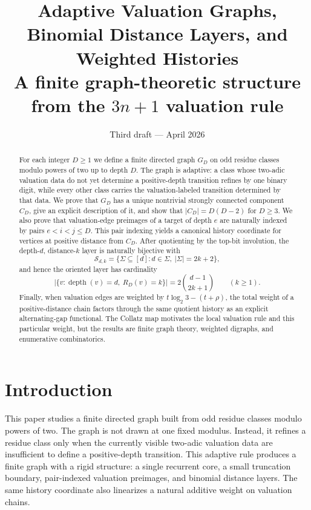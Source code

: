 \documentclass[11pt]{article}
\title{Adaptive Valuation Graphs, Binomial Distance Layers, and Weighted Histories\\
\large A finite graph-theoretic structure from the \texorpdfstring{$3n+1$}{3n+1} valuation rule}
\author{}
\date{Third draft --- April 2026}
\theoremstyle{definition}
\theoremstyle{remark}
\newcommand{\depth}{\operatorname{depth}}
\newcommand{\Sfam}{\mathcal S}
\begin{document}
\maketitle

\begin{abstract}
For each integer $D\ge 1$ we define a finite directed graph $G_D$ on odd residue classes modulo powers of two up to depth $D$.  The graph is adaptive: a class whose two-adic valuation data do not yet determine a positive-depth transition refines by one binary digit, while every other class carries the valuation-labeled transition determined by that data.  We prove that $G_D$ has a unique nontrivial strongly connected component $C_D$, give an explicit description of it, and show that $|C_D|=D(D-2)$ for $D\ge3$.  We also prove that valuation-edge preimages of a target of depth $e$ are naturally indexed by pairs $e<i<j\le D$.  This pair indexing yields a canonical history coordinate for vertices at positive distance from $C_D$.  After quotienting by the top-bit involution, the depth-$d$, distance-$k$ layer is naturally bijective with
\[
\Sfam_{d,k}=\{\Sigma\subseteq[d]: d\in\Sigma,\ |\Sigma|=2k+2\},
\]
and hence the oriented layer has cardinality
\[
\bigl|\{v:\depth(v)=d,\ R_D(v)=k\}\bigr|=2\binom{d-1}{2k+1}\qquad(k\ge1).
\]
Finally, when valuation edges are weighted by $t\log_2 3-(t+\rho)$, the total weight of a positive-distance chain factors through the same quotient history as an explicit alternating-gap functional.  The Collatz map motivates the local valuation rule and this particular weight, but the results are finite graph theory, weighted digraphs, and enumerative combinatorics.
\end{abstract}

\section{Introduction}

This paper studies a finite directed graph built from odd residue classes modulo powers of two.  The graph is not drawn at one fixed modulus.  Instead, it refines a residue class only when the currently visible two-adic valuation data are insufficient to define a positive-depth transition.  This adaptive rule produces a finite graph with a rigid structure: a single recurrent core, a small truncation boundary, pair-indexed valuation preimages, and binomial distance layers.  The same history coordinate also linearizes a natural additive weight on valuation chains.
\end{document}
